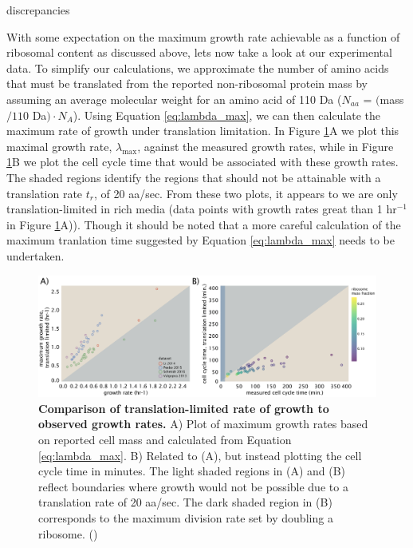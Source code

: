discrepancies \documentclass[11pt, letterpaper]{article}
\begin{document}


With some expectation on the maximum growth rate achievable as a function of
ribosomal content as discussed above, lets now take a look at our experimental
data. To simplify our calculations, we approximate the number of amino acids
that must be translated from the reported non-ribosomal protein mass by assuming
an average molecular weight for an amino acid of 110 Da ($N_{aa}$ = $($mass$ /
110$ Da$) \cdot N_A$). Using Equation \ref{eq:lambda_max}, we can then calculate
the maximum rate of growth under translation limitation. In Figure
\ref{fig:estimates_translation_data}A we plot this maximal growth rate,
$\lambda_{\text{max}}$,  against the measured growth rates, while in Figure
\ref{fig:estimates_translation_data}B we plot the cell cycle time that would be
associated with these growth rates. The shaded regions identify the regions that
should not be attainable with a translation rate $t_r$, of 20 aa/sec. From these two
plots, it appears to we are only translation-limited in rich media (data points
with growth rates great than 1 hr$^{-1}$ in Figure
\ref{fig:estimates_translation_data}A)). Though it should be noted that a more
careful calculation of the maximum tranlation time suggested by Equation
\ref{eq:lambda_max} needs to be undertaken.



\begin{figure}[H]
		\centering
    \includegraphics[width=1\textwidth]{../../code/figures/SI/estimates_translation_data.pdf}
  \caption{{\bf Comparison of translation-limited rate of growth to observed growth rates.}
	A) Plot of maximum growth rates based on reported cell mass and calculated from Equation \ref{eq:lambda_max}.
	B) Related to (A), but instead plotting the cell cycle time in minutes.
	The light shaded regions in (A) and (B) reflect boundaries where growth would not be possible
	due to a translation rate of 20 aa/sec. The dark shaded region in (B) corresponds to the maximum
	division rate set by doubling a ribosome.
	()}
  \label{fig:estimates_translation_data}
\end{figure}
\end{document}
